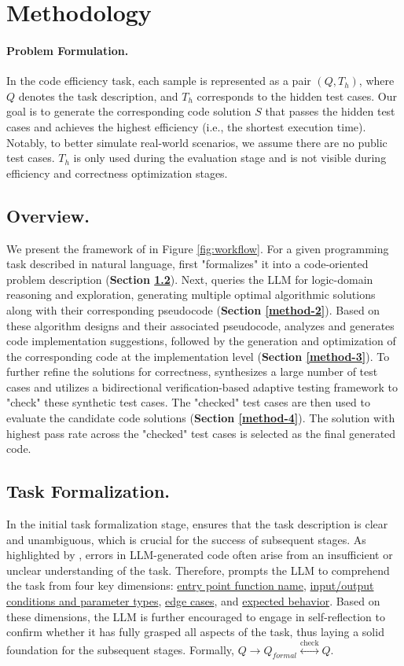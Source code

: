 \section{Methodology}
\paragraph{Problem Formulation.}
In the code efficiency task, each sample is represented as a pair $(Q, T_h)$, where $Q$ denotes the task description, and $T_h$ corresponds to the hidden test cases. Our goal is to generate the corresponding code solution $S$ that passes the hidden test cases and achieves the highest efficiency (i.e., the shortest execution time). Notably, to better simulate real-world scenarios, we assume there are no public test cases. $T_h$ is only used during the evaluation stage and is not visible during efficiency and correctness optimization stages.

\subsection{Overview.}
We present the framework of \tool in Figure \ref{fig:workflow}. For a given programming task described in natural language, \tool first "formalizes" it into a code-oriented problem description (\textbf{Section \ref{method-1}}). Next, \tool queries the LLM for logic-domain reasoning and exploration, generating multiple optimal algorithmic solutions along with their corresponding pseudocode (\textbf{Section \ref{method-2}}). Based on these algorithm designs and their associated pseudocode, \tool analyzes and generates code implementation suggestions, followed by the generation and optimization of the corresponding code at the implementation level (\textbf{Section \ref{method-3}}). To further refine the solutions for correctness, \tool synthesizes a large number of test cases and utilizes a bidirectional verification-based adaptive testing framework to "check" these synthetic test cases. The "checked" test cases are then used to evaluate the candidate code solutions (\textbf{Section \ref{method-4}}). The solution with highest pass rate across the "checked" test cases is selected as the final generated code.

\subsection{Task Formalization.}
\label{method-1}
In the initial task formalization stage, \tool ensures that the task description is clear and unambiguous, which is crucial for the success of subsequent stages. As highlighted by \citet{han-etal-2024-archcode}, errors in LLM-generated code often arise from an insufficient or unclear understanding of the task. Therefore, \tool prompts the LLM to comprehend the task from four key dimensions: \uline{entry point function name}, \uline{input/output conditions and parameter types}, \uline{edge cases}, and \uline{expected behavior}. Based on these dimensions, the LLM is further encouraged to engage in self-reflection to confirm whether it has fully grasped all aspects of the task, thus laying a solid foundation for the subsequent stages. Formally, $Q \to Q_{formal} \overset{\text{check}} {\longleftrightarrow} Q$.

